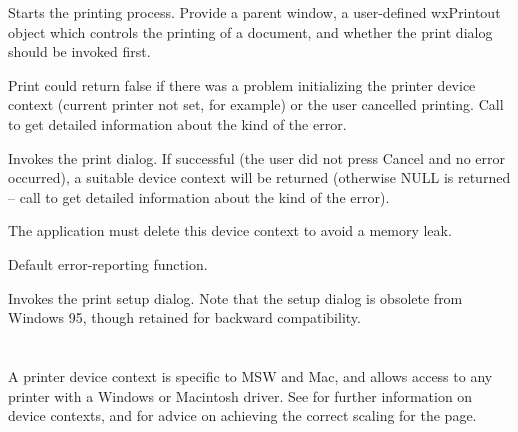 Starts the printing process. Provide a parent window, a user-defined wxPrintout object which controls
the printing of a document, and whether the print dialog should be invoked first.

Print could return false if there was a problem initializing the printer device context
(current printer not set, for example) or the user cancelled printing. Call
 to get detailed
information about the kind of the error.


\label{wxprinterprintdialog}


Invokes the print dialog. If successful (the user did not press Cancel
and no error occurred), a suitable device context will be returned
(otherwise NULL is returned -- call
 to get detailed
information about the kind of the error).

The application must delete this device context to avoid a memory leak.


\label{wxprinterreporterror}


Default error-reporting function.


\label{wxprintersetup}


Invokes the print setup dialog. Note that the setup dialog is obsolete from
Windows 95, though retained for backward compatibility.

\section{}\label{wxprinterdc}

A printer device context is specific to MSW and Mac, and allows access to any
printer with a Windows or Macintosh driver. See  for further
information on device contexts, and  for
advice on achieving the correct scaling for the page.


\\

